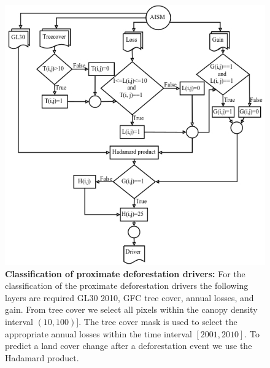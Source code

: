 			\begin{figure}[ht]
				\centering
				\includegraphics[scale=.68]{img/driver_flowchart}
				\caption[Classification of proximate deforestation drivers]{\textbf{Classification of proximate deforestation drivers:} For the classification of the proximate deforestation drivers the following layers are required GL30 2010, GFC tree cover, annual losses, and gain. From tree cover we select all pixels within the canopy density interval $(10,100)]$. The tree cover mask is used to select the appropriate annual losses within the time interval $[2001,2010]$. To predict a land cover change after a deforestation event we use the Hadamard product.}
				\label{fig:driver_flowchart}
			\end{figure}

